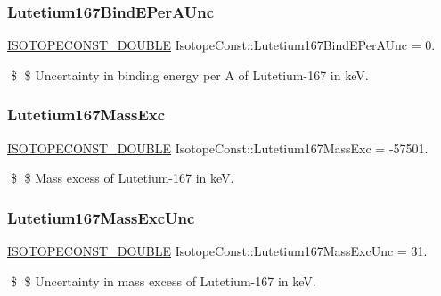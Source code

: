 \subsubsection{\texorpdfstring{Lutetium167\+Bind\+E\+Per\+A\+Unc}{Lutetium167BindEPerAUnc}}
{\footnotesize\ttfamily \mbox{\hyperlink{group___isotope_const-_macros_ga8f45a7272ce02c0b4c65c44636ed719a}{I\+S\+O\+T\+O\+P\+E\+C\+O\+N\+S\+T\+\_\+\+D\+O\+U\+B\+LE}} Isotope\+Const\+::\+Lutetium167\+Bind\+E\+Per\+A\+Unc = 0.}

\$ \$ Uncertainty in binding energy per A of Lutetium-\/167 in keV. \mbox{\label{group___isotope_const-_lutetium-_lu167_ga5fcd70b73b834cfd3b8e0883843689f7}} 
\subsubsection{\texorpdfstring{Lutetium167\+Mass\+Exc}{Lutetium167MassExc}}
{\footnotesize\ttfamily \mbox{\hyperlink{group___isotope_const-_macros_ga8f45a7272ce02c0b4c65c44636ed719a}{I\+S\+O\+T\+O\+P\+E\+C\+O\+N\+S\+T\+\_\+\+D\+O\+U\+B\+LE}} Isotope\+Const\+::\+Lutetium167\+Mass\+Exc = -\/57501.}

\$ \$ Mass excess of Lutetium-\/167 in keV. \mbox{\label{group___isotope_const-_lutetium-_lu167_gae7df529eac248dce516efe149c26f086}} 
\subsubsection{\texorpdfstring{Lutetium167\+Mass\+Exc\+Unc}{Lutetium167MassExcUnc}}
{\footnotesize\ttfamily \mbox{\hyperlink{group___isotope_const-_macros_ga8f45a7272ce02c0b4c65c44636ed719a}{I\+S\+O\+T\+O\+P\+E\+C\+O\+N\+S\+T\+\_\+\+D\+O\+U\+B\+LE}} Isotope\+Const\+::\+Lutetium167\+Mass\+Exc\+Unc = 31.}

\$ \$ Uncertainty in mass excess of Lutetium-\/167 in keV. \mbox{\label{group___isotope_const-_lutetium-_lu167_gae4854f05e41f0f6944b5cc45bc0a2991}} 
